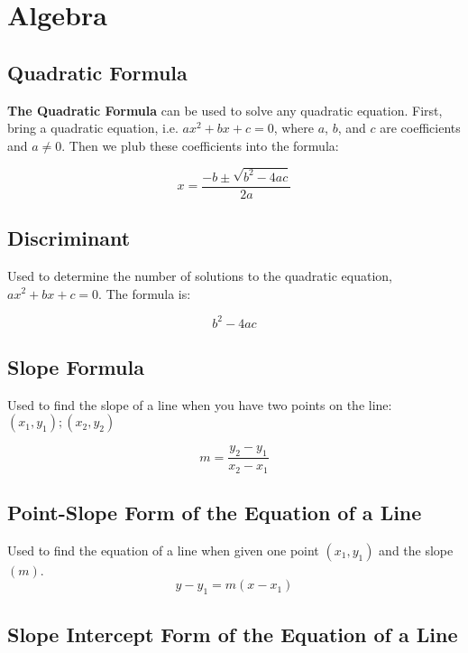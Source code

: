 \chapter{Algebra}

\section{Quadratic Formula}

\noindent \textbf{The Quadratic Formula} can be used to solve any quadratic 
equation. First, bring a quadratic equation, i.e. $ax^2+bx+c=0$, where $a$, $b$, 
and $c$ are coefficients and $a\neq 0$. Then we plub these coefficients into the 
formula:

\begin{equation*}
  x = \frac{-b \pm \sqrt{b^2-4ac}}{2a}
\end{equation*}


\section{Discriminant}

\noindent Used to determine the number of solutions to the quadratic equation,
$ax^2+bx+c=0$. The formula is:

\begin{equation*}
  b^2-4ac
\end{equation*}


\section{Slope Formula}

\noindent Used to find the slope of a line when you have two points on the line:
$(x_1, y_1); (x_2, y_2)$

\begin{equation*}
  m = \frac{y_2 - y_1}{x_2 - x_1}
\end{equation*}


\section{Point-Slope Form of the Equation of a Line}

\noindent Used to find the equation of a line when given one point $(x_1, y_1)$
and the slope $(m)$.
\begin{equation*}
  y - y_1 = m(x-x_1)
\end{equation*}


\section{Slope Intercept Form of the Equation of a Line}

